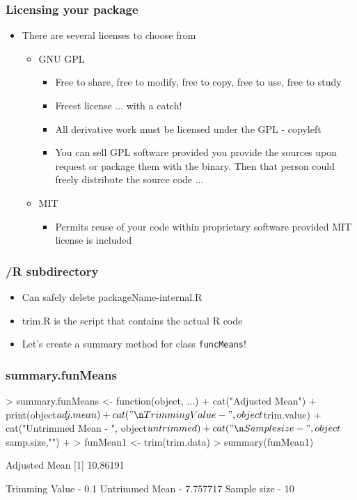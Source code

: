 \documentclass[xcolor=svgnames]{beamer}
\begin{document}
\begin{frame}[fragile]
  \frametitle{Licensing your package}
  \begin{itemize}
  \item There are several licenses to choose from
    \begin{itemize}
    \item GNU GPL
      \begin{itemize}
      \item Free to share, free to modify, free to copy, free to use, free to study
      \item Freest license ... with a catch!
      \item All derivative work must be licensed under the GPL - copyleft
      \item You can sell GPL software provided you provide the sources upon request or package them with the binary. Then that person could freely distribute the source code ...  
      \end{itemize}
\item MIT
  \begin{itemize}
  \item Permits reuse of your code within proprietary software provided MIT license is included
  \end{itemize}

    \end{itemize}

  \end{itemize}
\end{frame}

\begin{frame}
  \frametitle{/R subdirectory}
  \begin{itemize}
  \item Can safely delete packageName-internal.R
  \item trim.R is the script that contains the actual R code
  \item Let's create a summary method for class \texttt{funcMeans}! 
  \end{itemize}
\end{frame}

\begin{frame}[fragile]
  \frametitle{summary.funMeans}
\begin{Schunk}
\begin{Sinput}
>   summary.funMeans <- function(object, ...){
+       cat("\n Adjusted Mean\n")
+       print(object$adj.mean)
+       cat("\n Trimming Value - ", object$trim.value)
+       cat("\n Untrimmed Mean - ", object$untrimmed)
+       cat("\n Sample size - ", object$samp.size,"\n")
+   }
> funMean1 <- trim(trim.data)
> summary(funMean1)
\end{Sinput}
\begin{Soutput}
 Adjusted Mean
[1] 10.86191

 Trimming Value -  0.1
 Untrimmed Mean -  7.757717
 Sample size -  10 
\end{Soutput}
\end{Schunk}
\end{frame}
\end{document}

